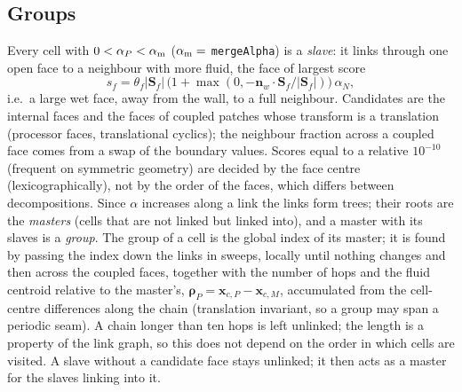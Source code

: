 \documentclass[11pt,a4paper]{article}
\theoremstyle{remark}
\newcommand{\nn}{\bm{n}}
\newcommand{\xx}{\bm{x}}
\newcommand{\Sf}{\bm{S}_f}
\newcommand{\code}[1]{\texttt{#1}}
\begin{document}
\subsection{Groups}

Every cell with $0<\alpha_P<\alpha_{\rm m}$ ($\alpha_{\rm m}=$ \code{mergeAlpha}) is a
\emph{slave}: it links through one open face to a neighbour with more fluid, the face of
largest score
\begin{equation}
s_f=\theta_f|\Sf|\,\bigl(1+\max(0,-\nn_w\cdot\Sf/|\Sf|)\bigr)\,\alpha_N ,
\end{equation}
i.e.\ a large wet face, away from the wall, to a full neighbour. Candidates are the internal
faces and the faces of coupled patches whose transform is a translation (processor faces,
translational cyclics); the neighbour fraction across a coupled face comes from a swap of the
boundary values. Scores equal to a relative $10^{-10}$ (frequent on symmetric geometry) are
decided by the face centre (lexicographically), not by the order of the faces, which differs
between decompositions. Since $\alpha$ increases along a link the links form trees; their roots
are the \emph{masters} (cells that are not linked but linked into), and a master with its
slaves is a \emph{group}. The group of a cell is the global index of its master; it is found by
passing the index down the links in sweeps, locally until nothing changes and then across the
coupled faces, together with the number of hops and the fluid centroid relative to the master's,
$\bm\rho_P=\xx_{c,P}-\xx_{c,M}$, accumulated from the cell-centre differences along the chain
(translation invariant, so a group may span a periodic seam). A chain longer than ten hops is
left unlinked; the length is a property of the link graph, so this does not depend on the order
in which cells are visited. A slave without a candidate face stays unlinked; it then acts as a
master for the slaves linking into it.
\end{document}

